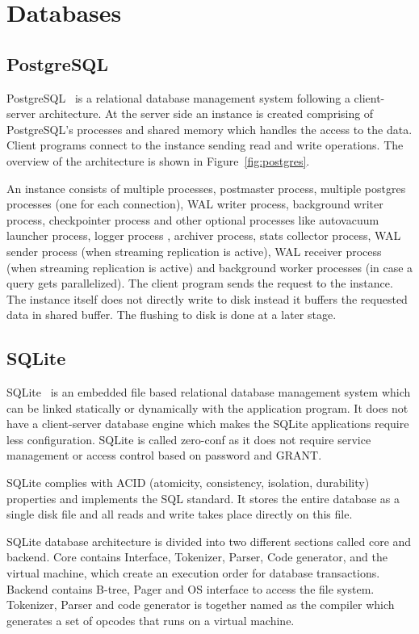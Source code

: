 \section{Databases}
\label{sec:db}

\subsection{PostgreSQL}

PostgreSQL~\cite{ref:pg1} is a relational database management system following a client-server architecture. At the server side an instance is created comprising of PostgreSQL's processes and shared memory which handles the access to the data. Client programs connect to the instance sending read and write operations. The overview of the architecture is shown in Figure~\ref{fig:postgres}.

An instance consists of multiple processes,  postmaster process, multiple postgres processes (one for each connection), WAL writer process, background writer process, checkpointer process and other optional processes like autovacuum launcher process, logger process , archiver process, stats collector process, WAL sender process (when streaming replication is active), WAL receiver process (when streaming replication is active) and background worker processes (in case a query gets parallelized). The client program sends the request to the instance. The instance itself does not directly write to disk instead it buffers the requested data in shared buffer. The flushing to disk is done at a later stage.

\subsection{SQLite}


SQLite~\cite{ref:sqlite2} is an embedded file based relational database management system which can be linked statically or dynamically with the application program. It does not have a client-server database engine which makes the SQLite applications require less configuration. SQLite is called zero-conf as it does not require service management or access control based on password and GRANT.


SQLite complies with ACID  (atomicity, consistency, isolation, durability) properties and implements the SQL standard. It stores the entire database as a single disk file and all reads and write takes place directly on this file. 

SQLite database architecture is divided into two different sections called core and backend. Core contains Interface, Tokenizer, Parser, Code generator, and the virtual machine, which create an execution order for database transactions. Backend contains B-tree, Pager and OS interface to access the file system. Tokenizer, Parser and code generator is together named as the compiler which generates a set of opcodes that runs on a virtual machine.
